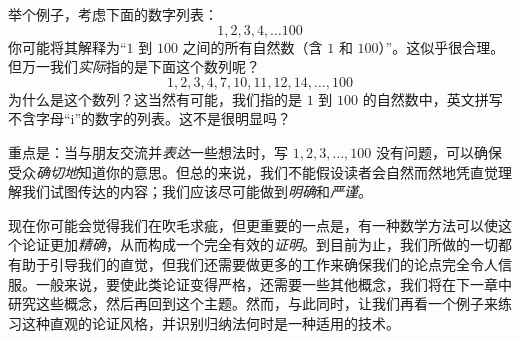 举个例子，考虑下面的数字列表：
\[1,2,3,4,\dots 100\]
你可能将其解释为``$1$ 到 $100$ 之间的所有自然数（含 $1$ 和 $100$）''。这似乎很合理。但万一我们\emph{实际}指的是下面这个数列呢？
\[1, 2, 3, 4, 7, 10, 11, 12, 14, \dots , 100\]
为什么是这个数列？这当然有可能，我们指的是 $1$ 到 $100$ 的自然数中，英文拼写不含字母``i''的数字的列表。这不是很明显吗？

重点是：当与朋友交流并\emph{表达}一些想法时，写 $1,2,3, \dots, 100$ 没有问题，可以确保受众\emph{确切地}知道你的意思。但总的来说，我们不能假设读者会自然而然地凭直觉理解我们试图传达的内容；我们应该尽可能做到\emph{明确}和\emph{严谨}。

现在你可能会觉得我们在吹毛求疵，但更重要的一点是，有一种数学方法可以使这个论证更加\emph{精确}，从而构成一个完全有效的\emph{证明}。到目前为止，我们所做的一切都有助于引导我们的直觉，但我们还需要做更多的工作来确保我们的论点完全令人信服。一般来说，要使此类论证变得严格，还需要一些其他概念，我们将在下一章中研究这些概念，然后再回到这个主题。然而，与此同时，让我们再看一个例子来练习这种直观的论证风格，并识别归纳法何时是一种适用的技术。
